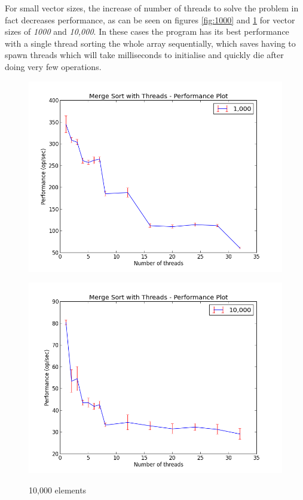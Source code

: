 \documentclass{article}
\begin{document}
  For small vector sizes, the increase of number of threads to solve the problem in fact decreases performance, as can be seen on figures \ref{fig:1000} and \ref{fig:10000} for vector sizes of \textit{1000} and \textit{10,000}. In these cases the program has its best performance with a single thread sorting the whole array sequentially, which saves having to spawn threads which will take milliseconds to initialise and quickly die after doing very few operations.

  \begin{figure}
  \centering
  \begin{minipage}{0.45\textwidth}
    \caption{1,000 elements}
    \includegraphics[width=1\linewidth, natwidth=800, natheight=600]{evaluation/graphs/1000.png}
    \label{fig:1000}
  \end{minipage}
  \begin{minipage}{0.45\textwidth}
    \caption{10,000 elements}
    \includegraphics[width=1\linewidth, natwidth=800, natheight=600]{evaluation/graphs/10000.png}
    \label{fig:10000}
  \end{minipage}
  \end{figure}
\end{document}
